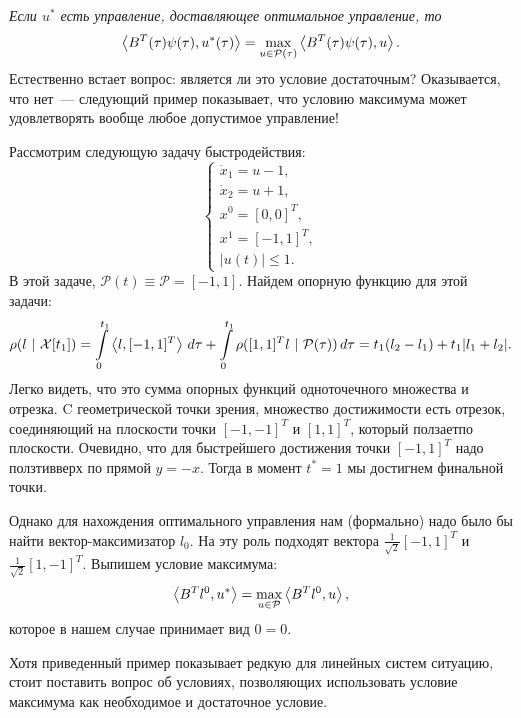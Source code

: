 \textit{Если $u^*$ есть управление, доставляющее оптимальное управление, то}
\begin{equation}\label{QT_PMP}
  \left<B^T(\tau)\psi(\tau),u^*(\tau)\right> =
  \max\limits_{u \in \mathcal{P}(\tau)}\left<B^T(\tau)\psi(\tau),u\right>.
\end{equation}
Естественно встает вопрос: является ли это условие достаточным?
Оказывается, что нет~--- следующий пример показывает,
что условию максимума может удовлетворять вообще любое допустимое управление!
\begin{ex}
  Рассмотрим следующую задачу быстродействия:
  \begin{equation*}
    \begin{cases}
      \dot{x}_1 = u - 1,\\
      \dot{x}_2 = u + 1,\\
      x^0 = [0,0]^T,\\
      x^1= [-1,1]^T,\\
      |u(t)| \leqslant 1.
    \end{cases}
  \end{equation*}
  В этой задаче,
  $\mathcal{P}(t) \equiv \mathcal{P} = [-1,1].$
  Найдем опорную функцию для этой задачи:
  $$
    \rho(l\ |\ \mathcal{X}[t_1]) =
    \int\limits_{0}^{t_1}\left<l,[-1,1]^T\right>\,d\tau +
    \int\limits_{0}^{t_1}\rho([1, 1]^Tl\ |\ \mathcal{P(\tau)})\,d\tau =
    t_1(l_2 - l_1) + t_1|l_1 + l_2|.
  $$
  Легко видеть,
  что это сумма опорных функций одноточечного множества и отрезка.
  C геометрической точки зрения,
  множество достижимости есть отрезок,
  соединяющий на плоскости точки $[-1,-1]^T$ и $[1,1]^T$,
  который \glqq ползает\grqq по плоскости.
  Очевидно,
  что для быстрейшего достижения точки $[-1,1]^T$
  надо \glqq ползти\grqq вверх по прямой $y = -x$.
  Тогда в момент $t^*=1$ мы достигнем финальной точки.

  Однако для нахождения оптимального управления
  нам (формально) надо было бы найти вектор-максимизатор $l_0$.
  На эту роль подходят вектора
  $\frac{1}{\sqrt{2}}[-1,1]^T$ и $\frac{1}{\sqrt{2}}[1,-1]^T$.
  Выпишем условие максимума:
  $$
    \left<B^Tl^0,u^*\right> = \max\limits_{u \in \mathcal{P}}\left<B^Tl^0,u\right>,
  $$
  которое в нашем случае принимает вид $0 = 0$.
\end{ex}

Хотя приведенный пример показывает редкую
для линейных систем ситуацию,
стоит поставить вопрос об условиях,
позволяющих использовать условие максимума
как необходимое и достаточное условие.
